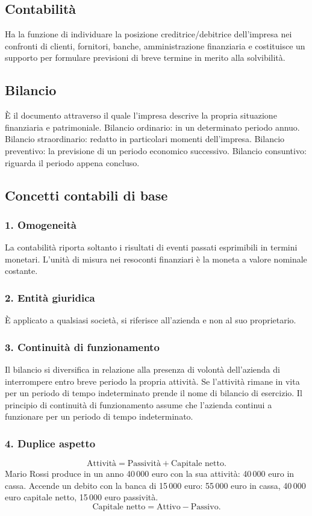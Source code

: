 \documentclass[11pt,a4paper]{article}
\newcommand{\orig}[1]{\clearpage}
\begin{document}
\subsection*{Contabilità}
Ha la funzione di individuare la posizione creditrice/debitrice dell'impresa nei confronti di clienti, fornitori, banche, amministrazione finanziaria e costituisce un supporto per formulare previsioni di breve termine in merito alla solvibilità.
\subsection*{Bilancio}
È il documento attraverso il quale l'impresa descrive la propria situazione finanziaria e patrimoniale.
Bilancio ordinario: in un determinato periodo annuo. Bilancio straordinario: redatto in particolari momenti dell'impresa.
\orig{19}
Bilancio preventivo: la previsione di un periodo economico successivo. Bilancio consuntivo: riguarda il periodo appena concluso.
\subsection*{Concetti contabili di base}
\subsubsection*{1. Omogeneità}
La contabilità riporta soltanto i risultati di eventi passati esprimibili in termini monetari. L'unità di misura nei resoconti finanziari è la moneta a valore nominale costante.
\subsubsection*{2. Entità giuridica}
È applicato a qualsiasi società, si riferisce all'azienda e non al suo proprietario.
\subsubsection*{3. Continuità di funzionamento}
Il bilancio si diversifica in relazione alla presenza di volontà dell'azienda di interrompere entro breve periodo la propria attività. Se l'attività rimane in vita per un periodo di tempo indeterminato prende il nome di bilancio di esercizio.
Il principio di continuità di funzionamento assume che l'azienda continui a funzionare per un periodo di tempo indeterminato.
\orig{20}\subsubsection*{4. Duplice aspetto}
\[\text{Attività}=\text{Passività}+\text{Capitale netto}.\]
Mario Rossi produce in un anno 40\,000 euro con la sua attività: 40\,000 euro in cassa. Accende un debito con la banca di 15\,000 euro: 55\,000 euro in cassa, 40\,000 euro capitale netto, 15\,000 euro passività.
\[\text{Capitale netto}=\text{Attivo}-\text{Passivo}.\]
\end{document}
